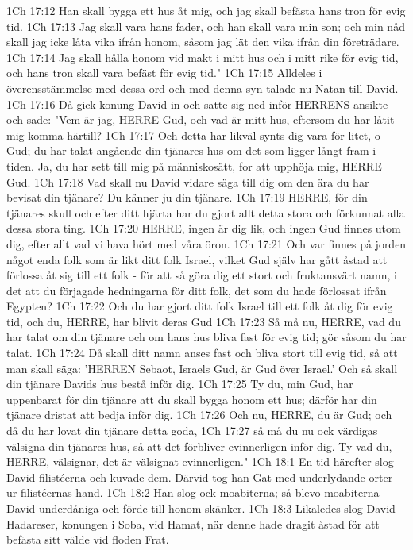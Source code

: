 1Ch 17:12  Han skall bygga ett hus åt mig, och jag skall befästa hans tron för evig tid.
1Ch 17:13  Jag skall vara hans fader, och han skall vara min son; och min nåd skall jag icke låta vika ifrån honom, såsom jag lät den vika ifrån din företrädare.
1Ch 17:14  Jag skall hålla honom vid makt i mitt hus och i mitt rike för evig tid, och hans tron skall vara befäst för evig tid."
1Ch 17:15  Alldeles i överensstämmelse med dessa ord och med denna syn talade nu Natan till David.
1Ch 17:16  Då gick konung David in och satte sig ned inför HERRENS ansikte och sade: "Vem är jag, HERRE Gud, och vad är mitt hus, eftersom du har låtit mig komma härtill?
1Ch 17:17  Och detta har likväl synts dig vara för litet, o Gud; du har talat angående din tjänares hus om det som ligger långt fram i tiden. Ja, du har sett till mig på människosätt, for att upphöja mig, HERRE Gud.
1Ch 17:18  Vad skall nu David vidare säga till dig om den ära du har bevisat din tjänare? Du känner ju din tjänare.
1Ch 17:19  HERRE, för din tjänares skull och efter ditt hjärta har du gjort allt detta stora och förkunnat alla dessa stora ting.
1Ch 17:20  HERRE, ingen är dig lik, och ingen Gud finnes utom dig, efter allt vad vi hava hört med våra öron.
1Ch 17:21  Och var finnes på jorden något enda folk som är likt ditt folk Israel, vilket Gud själv har gått åstad att förlossa åt sig till ett folk - för att så göra dig ett stort och fruktansvärt namn, i det att du förjagade hedningarna för ditt folk, det som du hade förlossat ifrån Egypten?
1Ch 17:22  Och du har gjort ditt folk Israel till ett folk åt dig för evig tid, och du, HERRE, har blivit deras Gud
1Ch 17:23  Så må nu, HERRE, vad du har talat om din tjänare och om hans hus bliva fast för evig tid; gör såsom du har talat.
1Ch 17:24  Då skall ditt namn anses fast och bliva stort till evig tid, så att man skall säga: 'HERREN Sebaot, Israels Gud, är Gud över Israel.' Och så skall din tjänare Davids hus bestå inför dig.
1Ch 17:25  Ty du, min Gud, har uppenbarat för din tjänare att du skall bygga honom ett hus; därför har din tjänare dristat att bedja inför dig.
1Ch 17:26  Och nu, HERRE, du är Gud; och då du har lovat din tjänare detta goda,
1Ch 17:27  så må du nu ock värdigas välsigna din tjänares hus, så att det förbliver evinnerligen inför dig. Ty vad du, HERRE, välsignar, det är välsignat evinnerligen."
1Ch 18:1  En tid härefter slog David filistéerna och kuvade dem. Därvid tog han Gat med underlydande orter ur filistéernas hand.
1Ch 18:2  Han slog ock moabiterna; så blevo moabiterna David underdåniga och förde till honom skänker.
1Ch 18:3  Likaledes slog David Hadareser, konungen i Soba, vid Hamat, när denne hade dragit åstad för att befästa sitt välde vid floden Frat.

